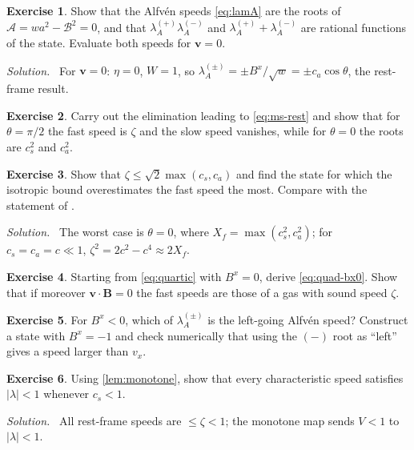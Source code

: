 \documentclass[11pt,a4paper,oneside,openany]{book}
\newcommand{\textcite}{\citet}
\theoremstyle{definition}
\newtheorem{exercise}{Exercise}[chapter]
\theoremstyle{plain}
\theoremstyle{remark}
\newenvironment{solution}{\par\smallskip\noindent\small\textit{Solution.}\ }{\par\medskip}
\newcommand{\vv}{\bm{v}}
\newcommand{\BB}{\bm{B}}
\newcommand{\calB}{\mathcal{B}}
\newcommand{\calA}{\mathcal{A}}
\newcommand{\vB}{\eta}
\begin{document}
\begin{exercise}
Show that the Alfvén speeds \eqref{eq:lamA} are the roots of $\calA=wa^2-\calB^2=0$, and
that $\lambda_A^{(+)}\lambda_A^{(-)}$ and $\lambda_A^{(+)}+\lambda_A^{(-)}$ are rational
functions of the state. Evaluate both speeds for $\vv=0$.
\end{exercise}
\begin{solution}
For $\vv=0$: $\vB=0$, $W=1$, so $\lambda_A^{(\pm)}=\pm B^x/\sqrt w=\pm c_a\cos\theta$, the
rest-frame result.
\end{solution}

\begin{exercise}
Carry out the elimination leading to \eqref{eq:ms-rest} and show that for $\theta=\pi/2$
the fast speed is $\zeta$ and the slow speed vanishes, while for $\theta=0$ the roots are
$c_s^2$ and $c_a^2$.
\end{exercise}

\begin{exercise}
Show that $\zeta\le\sqrt2\max(c_s,c_a)$ and find the state for which the isotropic bound
overestimates the fast speed the most. Compare with the statement of
\textcite{GammieMcKinneyToth2003}.
\end{exercise}
\begin{solution}
The worst case is $\theta=0$, where $X_f=\max(c_s^2,c_a^2)$; for $c_s=c_a=c\ll1$,
$\zeta^2=2c^2-c^4\approx2X_f$.
\end{solution}

\begin{exercise}
Starting from \eqref{eq:quartic} with $B^x=0$, derive \eqref{eq:quad-bx0}. Show that if
moreover $\vv\cdot\BB=0$ the fast speeds are those of a gas with sound speed $\zeta$.
\end{exercise}

\begin{exercise}
For $B^x<0$, which of $\lambda_A^{(\pm)}$ is the left-going Alfvén speed? Construct a
state with $B^x=-1$ and check numerically that using the $(-)$ root as ``left'' gives a
speed larger than $v_x$.
\end{exercise}

\begin{exercise}
Using \cref{lem:monotone}, show that every characteristic speed satisfies
$|\lambda|<1$ whenever $c_s<1$.
\end{exercise}
\begin{solution}
All rest-frame speeds are $\le\zeta<1$; the monotone map sends $V<1$ to $|\lambda|<1$.
\end{solution}
\end{document}
